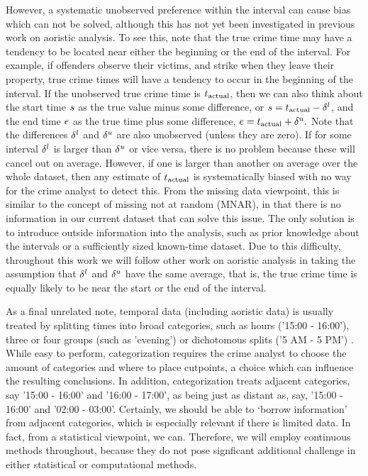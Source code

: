 However, a systematic unobserved preference within the interval can cause bias which can not be solved, although this has not yet been investigated in previous work on aoristic analysis. To see this, note that the true crime time may have a tendency to be located near either the beginning or the end of the interval. For example, if offenders observe their victims, and strike when they leave their property, true crime times will have a tendency to occur in the beginning of the interval. If the unobserved true crime time is $t_{\text{actual}}$, then we can also think about the start time $s$ as the true value minus some difference, or $s = t_{\text{actual}} - {\delta^l}$, and the end time $e$ as the true time plus some difference, $e = t_{\text{actual}} + {\delta^u}.$ Note that the differences ${\delta^l}$ and ${\delta^u}$ are also unobserved (unless they are zero). If for some interval ${\delta^l}$ is larger than ${\delta^u}$ or vice versa, there is no problem because these will cancel out on average. However, if one is larger than another on average over the whole dataset, then any estimate of $t_{\text{actual}}$ is systematically biased with no way for the crime analyst to detect this. From the missing data viewpoint, this is similar to the concept of missing not at random (MNAR), in that there is no information in our current dataset that can solve this issue. The only solution is to introduce outside information into the analysis, such as prior knowledge about the intervals or a sufficiently sized known-time dataset. Due to this difficulty, throughout this work we will follow other work on aoristic analysis in taking the assumption that ${\delta^l}$ and ${\delta^u}$ have the same average, that is, the true crime time is equally likely to be near the start or the end of the interval.

As a final unrelated note, temporal data (including aoristic data) is usually treated by splitting times into broad categories,  such as hours ('15:00 - 16:00'), three or four groups (such as 'evening') \citep{pereira2016temporal} or dichotomous splits ('5 AM - 5 PM') \citep{felson2003simple}. While easy to perform, categorization requires the crime analyst to choose the amount of categories and where to place cutpoints, a choice which can influence the resulting conclusions. In addition, categorization treats adjacent categories, say '15:00 - 16:00' and '16:00 - 17:00', as being just as distant as, say, '15:00 - 16:00' and '02:00 - 03:00'. Certainly, we should be able to `borrow information' from adjacent categories, which is especially relevant if there is limited data. In fact, from a statistical viewpoint, we can. Therefore, we will employ continuous methods throughout, because they do not pose signficant additional challenge in either statistical or computational methods.

